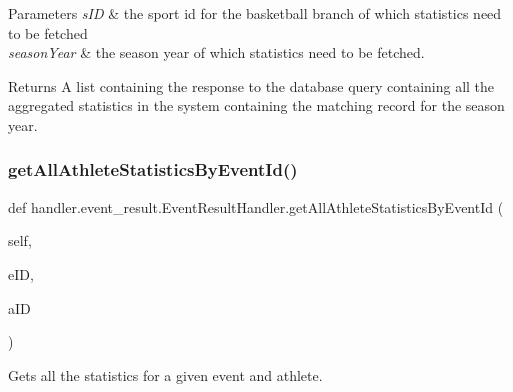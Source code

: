 \begin{DoxyParams}{Parameters}
{\em s\+ID} & the sport id for the basketball branch of which statistics need to be fetched \\
\hline
{\em season\+Year} & the season year of which statistics need to be fetched.\\
\hline
\end{DoxyParams}
\begin{DoxyReturn}{Returns}
A list containing the response to the database query containing all the aggregated statistics in the system containing the matching record for the season year. 
\end{DoxyReturn}
\mbox{\label{classhandler_1_1event__result_1_1_event_result_handler_a9dd07bb5cbde7d150d9d37d2e558c46f}} 
\subsubsection{\texorpdfstring{get\+All\+Athlete\+Statistics\+By\+Event\+Id()}{getAllAthleteStatisticsByEventId()}}
{\footnotesize\ttfamily def handler.\+event\+\_\+result.\+Event\+Result\+Handler.\+get\+All\+Athlete\+Statistics\+By\+Event\+Id (\begin{DoxyParamCaption}\item[{}]{self,  }\item[{}]{e\+ID,  }\item[{}]{a\+ID }\end{DoxyParamCaption})}



Gets all the statistics for a given event and athlete. 


